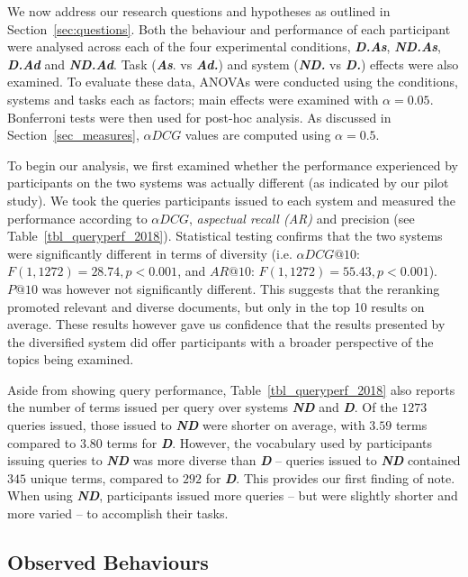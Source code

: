 We now address our research questions and hypotheses as outlined in Section~\ref{sec:questions}. Both the behaviour and performance of each participant were analysed across each of the four experimental conditions, \textbf{\emph{D.As}}, \textbf{\emph{ND.As}}, \textbf{\emph{D.Ad}} and \textbf{\emph{ND.Ad}}. Task (\emph{\textbf{As}}. vs \emph{\textbf{Ad.}}) and system (\emph{\textbf{ND.}} vs \emph{\textbf{D.}}) effects were also examined. To evaluate these data, ANOVAs were conducted using the conditions, systems and tasks each as factors; main effects were examined with $\alpha=0.05$. Bonferroni tests were then used for post-hoc analysis. As discussed in Section~\ref{sec_measures}, $\alpha DCG$ values are computed using $\alpha=0.5$.

To begin our analysis, we first examined whether the performance experienced by participants on the two systems was actually different (as indicated by our pilot study). We took the queries participants issued to each system and measured the performance according to $\alpha DCG$, \emph{aspectual recall (AR)} and precision (see Table~\ref{tbl_queryperf_2018}). Statistical testing confirms that the two systems were significantly different in terms of diversity (i.e. $\alpha DCG@10$: $F(1, 1272)=28.74, p<0.001$, and $AR@10$: $F(1, 1272)=55.43, p<0.001$). $P@10$ was however not significantly different. This suggests that the reranking promoted relevant and diverse documents, but only in the top 10 results on average. These results however gave us confidence that the results presented by the diversified system did offer participants with a broader perspective of the topics being examined.
 
Aside from showing query performance, Table~\ref{tbl_queryperf_2018} also reports the number of terms issued per query over systems \textbf{\emph{ND}} and \textbf{\emph{D}}. Of the $1273$ queries issued, those issued to \textbf{\emph{ND}} were shorter on average, with $3.59$ terms compared to $3.80$ terms for \textbf{\emph{D}}. However, the vocabulary used by participants issuing queries to \textbf{\emph{ND}} was more diverse than \textbf{\emph{D}} -- queries issued to \textbf{\emph{ND}} contained $345$ unique terms, compared to $292$ for \textbf{\emph{D}}.
This provides our first finding of note. When using \textbf{\emph{ND}}, participants issued more queries -- but were slightly shorter and more varied -- to accomplish their tasks. 

\subsection{Observed Behaviours}
